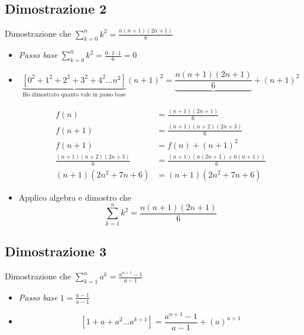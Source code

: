 \subsection{Dimostrazione 2}
\label{sub:dimostrazione2}
Dimostrazione che $\sum_{k=0}^{n} k^2 = \frac{n\left( n+1 \right) \left( 2n+1 \right) }{6} $
\begin{itemize}
	\item \textit{Passo base} $\sum_{k=0}^{0} k^2 = \frac{0 \cdot 1 \cdot 1}{6} = 0$
	\item \[
		      \underbrace{\left[0^2 + 1^2 + 2^2 + 3^2 + 4^2 \ldots n^2\right]}_{\text{Ho dimostrato quanto vale in passo base}} \left( n+1 \right)^2 = \underbrace{\frac{n\left( n+1 \right) \left( 2n+1 \right) }{6}} + \left( n+1 \right)^2
	      \]

	      \begin{align*}
		      f \left( n \right)                                                  & = \frac{\left( n+1 \right) \left( 2n+1 \right)}{6}                                       \\
		      f\left( n+1 \right)                                                 & = \frac{\left( n+1 \right) \left( n+2 \right) \left( 2n+3 \right)}{6}                    \\
		      f\left( n+1 \right)                                                 & = f\left( n \right) +\left( n+1 \right) ^2                                               \\
		      \frac{\left( n+1 \right) \left( n+2 \right) \left( 2n+3 \right)}{6} & = \frac{\left( n+1 \right) \left( n\left( 2n+1 \right) +6\left( n+1 \right)  \right)}{6} \\
		      \left( n+1 \right) \left( 2n^2 + 7n + 6 \right)                     & = \left( n+1 \right) \left( 2n^2 + 7n +6 \right)
	      \end{align*}

	\item Applico algebra e dimostro che
	      \[
		      \sum_{k=1}^{n} k^2 = \frac{n\left( n+1 \right) \left( 2n+1 \right)}{6}
	      \]

\end{itemize}
\subsection{Dimostrazione 3}
\label{sub:dimostrazione3}

Dimostrazione che $\sum_{k=1}^{n} a^{k} = \frac{a^{n+1}-1}{a-1}$
\begin{itemize}
	\item \textit{Passo base} $1=\frac{a-1}{a-1}$
	\item \[
		      \left[ 1+a+a^2 \ldots a^{k+1} \right]= \frac{a^{n+1}-1}{a-1} + \left( a \right) ^{n+1}
	      \]
\end{itemize}


